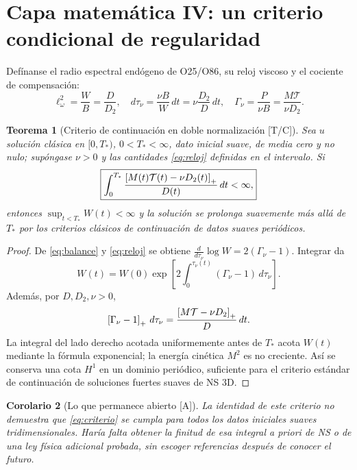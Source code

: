 \documentclass[11pt,a4paper]{article}
\newtheorem{teo}{Teorema}[section]
\newtheorem{cor}[teo]{Corolario}
\theoremstyle{definition}\newtheorem{defi}[teo]{Definición}
\newcommand{\stat}[1]{\textcolor{blue!50!black}{\textsf{[#1]}}}
\begin{document}
\section{Capa matemática IV: un criterio condicional de regularidad}
Defínanse el radio espectral endógeno de O25/O86, su reloj viscoso y el cociente de compensación:
\begin{equation}\label{eq:reloj}
\ell_\omega^2=\frac WB=\frac D{D_2},\quad
d\tau_\nu=\frac{\nu B}{W}\,dt=\nu\frac{D_2}{D}\,dt,\quad
\Gamma_\nu=\frac{P}{\nu B}=\frac{M\mathcal T}{\nu D_2}.
\end{equation}
\begin{teo}[Criterio de continuación en doble normalización \stat{T/C}]\label{th:criterion}
Sea $u$ solución clásica en $[0,T_*)$, $0<T_*<\infty$, dato inicial suave, de media cero y no nulo; supóngase $\nu>0$ y las cantidades \eqref{eq:reloj} definidas en el intervalo. Si
\begin{equation}\label{eq:criterio}
\boxed{\int_0^{T_*}\frac{\left[M(t)\mathcal T(t)-\nu D_2(t)\right]_+}{D(t)}\,dt<\infty,}
\end{equation}
entonces $\sup_{t<T_*}W(t)<\infty$ y la solución se prolonga suavemente más allá de $T_*$ por los criterios clásicos de continuación de datos suaves periódicos.
\end{teo}
\begin{proof}
De \eqref{eq:balance} y \eqref{eq:reloj} se obtiene
$\frac{d}{d\tau_\nu}\log W=2(\Gamma_\nu-1)$. Integrar da
\[W(t)=W(0)\exp\left[2\int_0^{\tau_\nu(t)}(\Gamma_\nu-1)\,d\tau_\nu\right].\]
Además, por $D,D_2,\nu>0$,
\[
\left[\Gamma_\nu-1\right]_+\,d\tau_\nu
=\frac{\left[M\mathcal T-\nu D_2\right]_+}{D}\,dt.
\]
La integral del lado derecho acotada uniformemente antes de $T_*$ acota $W(t)$ mediante la fórmula exponencial; la energía cinética $M^2$ es no creciente. Así se conserva una cota $H^1$ en un dominio periódico, suficiente para el criterio estándar de continuación de soluciones fuertes suaves de NS 3D.
\end{proof}
\begin{cor}[Lo que permanece abierto \stat{A}]
La identidad de este criterio no demuestra que \eqref{eq:criterio} se cumpla para \emph{todos} los datos iniciales suaves tridimensionales. Haría falta obtener la finitud de esa integral \emph{a priori} de NS o de una ley física adicional probada, sin escoger referencias después de conocer el futuro.
\end{cor}
\end{document}
